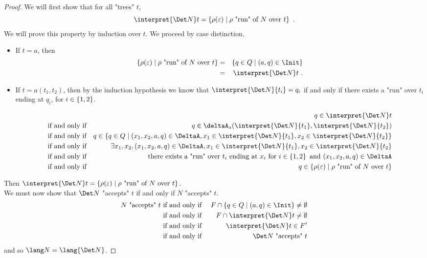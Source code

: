\documentclass[a4paper,UKenglish,cleveref, autoref, thm-restate]{lipics-v2021}
\begin{document}
\begin{proof}
	We will first show that for all "trees" $t$,
	\[
		\interpret {\Det N} t = \setdef {\rho(\varepsilon)}{\text{$\rho$ "run" of~$N$ over~$t$}}\ .
	\]
	We will prove this property by induction over $t$. We proceed by case distinction.
	\begin{itemize}
		\item If $t = a$, then
		      \begin{eqnarray*}
			      \setdef {\rho(\varepsilon)}{\text{$\rho$ "run" of~$N$ over~$t$}} &=&  \setdef {q \in Q} {(a,q) \in \Init} \\
			      &=& \interpret {\Det N} t\ .
		      \end{eqnarray*}
		\item If $t = a(t_1,t_2)$, then
		      by the induction hypothesis we know that
		      $\interpret {\Det N} {t_i} = q_i$ if and only if there exists a "run" over $t_i$ ending at $q_i$, for $i \in \left\{1,2\right\}$.

		      \begin{eqnarray*}
			      &&q \in \interpret {\Det N} t \\
			      &\text{if and only if}& q \in \deltaA_a (\interpret {\Det N} {t_1}, \interpret {\Det N} {t_2}) \\
			      &\text{if and only if}& q \in \setdef {q \in  Q} {(x_1,x_2,a,q) \in \DeltaA, x_1 \in \interpret {\Det N} {t_1}, x_2 \in \interpret {\Det N} {t_2}} \\
			      &\text{if and only if}& \exists x_1,x_2, (x_1,x_2,a,q) \in \DeltaA, x_1 \in \interpret {\Det N} {t_1}, x_2 \in \interpret {\Det N} {t_2} \\
			      &\text{if and only if}& \text{there exists a "run" over }  t_i  \text { ending at } x_i \text { for  } i \in \set {1,2} \text{ and } (x_1,x_2,a,q) \in \DeltaA\\
			      &\text{if and only if}& q \in \setdef {\rho(\varepsilon)}{\text{$\rho$ "run" of~$N$ over~$t$}}
		      \end{eqnarray*}
	\end{itemize}
	Then $ \interpret {\Det N} t = \setdef {\rho(\varepsilon)}{\text{$\rho$ "run" of~$N$ over~$t$}}$.\\

	We must now show that $\Det N$ "accepts" $t$ if and only if $N$ "accepts" $t$.
	\begin{eqnarray*}
		N \text{ "accepts" } t &\tiff& F \cap \setdef {q \in Q} {(a,q) \in \Init} \neq \emptyset \\
		&\tiff&   F \cap  \interpret {\Det N} t \neq \emptyset \\
		&\tiff& \interpret {\Det N} t  \in F' \\
		&\tiff& {\Det N} \text{ "accepts" } t
	\end{eqnarray*}
	and so $\lang N = \lang {\Det N}$.
\end{proof}
\end{document}
